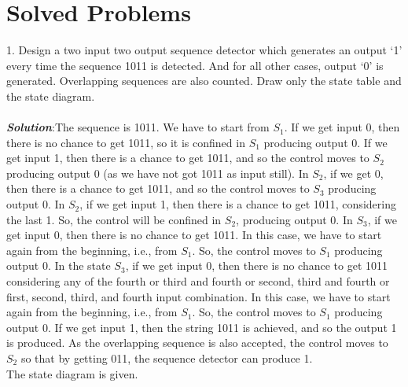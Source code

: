 \documentclass[12pt, a4paper]{article}
\begin{document}
\newpage
\section{Solved Problems}
1. Design a two input two output sequence detector which generates an output ‘1’ every time the sequence 1011 is detected. And for all other cases, output ‘0’ is generated. Overlapping sequences are also counted. Draw only the state table and the state diagram.\\
\\
\textbf{\emph{Solution}}:The sequence is 1011. We have to start from $S_{1}$. If we get input 0, then there is no chance to get 1011, so it is confined in $S_{1}$ producing output 0. If we get input 1, then there is a chance to get 1011, and so the control moves to $S_{2}$ producing output 0 (as we have not got 1011 as input still). In $S_{2}$, if we get 0, then there is a chance to get 1011, and so the control moves to $S_{3}$ producing output 0. In $S_{2}$, if we get input 1, then there is a chance to get 1011, considering the last 1. So, the
control will be confined in $S_{2}$, producing output 0.
In $S_{3}$, if we get input 0, then there is no chance to get 1011. In this case, we have to start again
from the beginning, i.e., from $S_{1}$. So, the control moves to $S_{1}$ producing output 0. In the state $S_{3}$, if we get input 0, then there is no chance to get 1011 considering any of the fourth or third and fourth or second, third and fourth or first, second, third, and fourth input combination. In this case, we
have to start again from the beginning, i.e., from $S_{1}$.
So, the control moves to $S_{1}$ producing output 0. If we get input 1, then the string 1011 is achieved, and so the output 1 is
produced. As the overlapping sequence is also accepted, the control moves to $S_{2}$ so that by getting 011, the sequence detector can produce 1. \\
\phantom{20} The state diagram is given. \\
\\
\begin{center}
\end{center}
\end{document}
